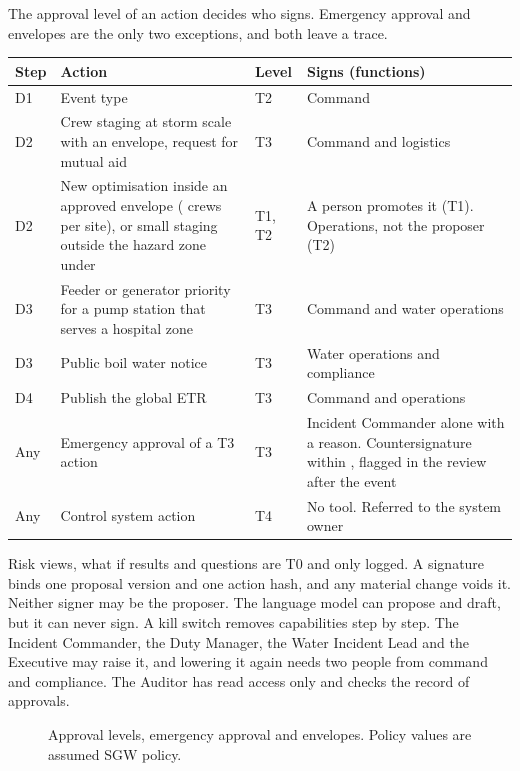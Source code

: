 \documentclass[fontsize=10pt,a4paper,DIV=12,parskip=half-,numbers=noenddot,headsepline,captions=tableheading]{scrartcl}
\begin{document}
The approval level of an action decides who signs. Emergency approval and envelopes are the only two exceptions, and both leave a trace.
{\footnotesize\par\noindent
\begin{tabularx}{\textwidth}{@{}L{1.0cm} Y L{1.1cm} L{5.0cm}@{}}
  \toprule
  \textbf{Step} & \textbf{Action} & \textbf{Level} & \textbf{Signs (functions)} \\ \midrule
  D1 & Event type & T2 & Command \\ \lightrowrule
  D2 & Crew staging at storm scale with an envelope, request for mutual aid & T3 & Command and logistics \\ \lightrowrule
  D2 & New optimisation inside an approved envelope ( crews per site), or small staging outside the hazard zone under  & T1, T2 & A person promotes it (T1). Operations, not the proposer (T2) \\ \lightrowrule
  D3 & Feeder or generator priority for a pump station that serves a hospital zone & T3 & Command and water operations \\ \lightrowrule
  D3 & Public boil water notice & T3 & Water operations and compliance \\ \lightrowrule
  D4 & Publish the global ETR & T3 & Command and operations \\ \lightrowrule
  Any & Emergency approval of a T3 action & T3 & Incident Commander alone with a reason. Countersignature within , flagged in the review after the event \\ \lightrowrule
  Any & Control system action & T4 & No tool. Referred to the system owner \\ \bottomrule
\end{tabularx}}\par
Risk views, what if results and questions are T0 and only logged. A signature binds one proposal version and one action hash, and any material change voids it. Neither signer may be the proposer. The language model can propose and draft, but it can never sign.
A kill switch removes capabilities step by step. The Incident Commander, the Duty Manager, the Water Incident Lead and the Executive may raise it, and lowering it again needs two people from command and compliance. The Auditor has read access only and checks the record of approvals.

\begin{figure}[tb]
  \centering
  \resizebox{0.62\textwidth}{!}{}
  \caption{Approval levels, emergency approval and envelopes. Policy values are assumed SGW policy.}
  \label{fig:signoff}
\end{figure}
\end{document}

